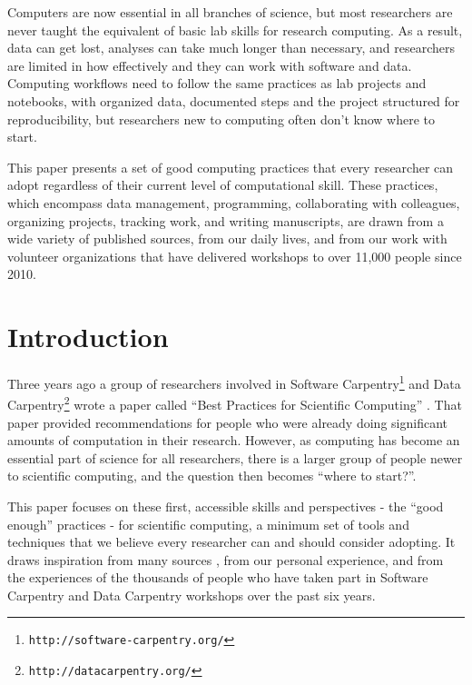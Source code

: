 \documentclass[10pt,letterpaper]{article}
\newcommand{\withurl}[2]{{#1}\footnote{{\texttt{#2}}}}
\begin{document}
Computers are now essential in all branches of science, but most
researchers are never taught the equivalent of basic lab skills for
research computing. As a result, data can get lost, analyses can take
much longer than necessary, and researchers are limited in how
effectively and they can work with software and data. Computing
workflows need to follow the same practices as lab projects and
notebooks, with organized data, documented steps and the project
structured for reproducibility, but researchers new to computing often
don't know where to start.

This paper presents a set of good computing practices that every
researcher can adopt regardless of their current level of
computational skill.  These practices, which encompass data
management, programming, collaborating with colleagues, organizing
projects, tracking work, and writing manuscripts, are drawn from a
wide variety of published sources, from our daily lives, and from our
work with volunteer organizations that have delivered workshops to
over 11,000 people since 2010.

\linenumbers

\section*{Introduction}\label{sec:introduction}

Three years ago a group of researchers involved in \withurl{Software
  Carpentry}{http://software-carpentry.org/} and \withurl{Data
  Carpentry}{http://datacarpentry.org/} wrote a paper called ``Best
Practices for Scientific Computing'' \cite{wilson2014}.  That paper
provided recommendations for people who were already doing significant
amounts of computation in their research.  However, as computing has
become an essential part of science for all researchers, there is a
larger group of people newer to scientific computing, and the question
then becomes ``where to start?''.

This paper focuses on these first, accessible skills and perspectives
- the ``good enough'' practices - for scientific computing, a minimum
set of tools and techniques that we believe every researcher can and
should consider adopting. It draws inspiration from many sources
\cite{gentzkow2014,noble2009,brown2015,wickham2014,kitzes2016,sandve2013,hart2016},
from our personal experience, and from the experiences of the
thousands of people who have taken part in Software Carpentry and Data
Carpentry workshops over the past six years.
\end{document}
